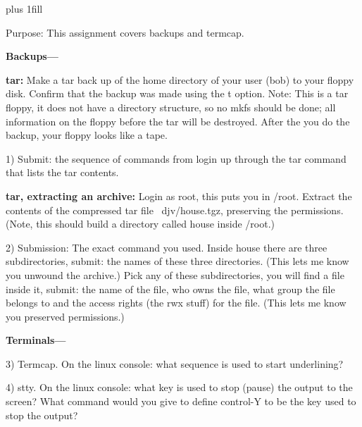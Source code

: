 
\rightskip=0pt plus 1fill

\parindent 0pt

Purpose: This assignment covers backups and termcap.

{\bf Backups---}

{\bf tar:}
Make a tar back up of the home directory of your user (bob) to your floppy
disk.
Confirm that the backup was made using the {\ltt{}t} option.
Note: This is a tar floppy, it does not have a directory structure,
so no mkfs should be done; all information on the floppy before
the tar will be destroyed. After the you do the backup, your
floppy looks like a tape.

1) Submit: the sequence of commands from login up through the
tar command that lists the tar contents.

{\bf tar, extracting an archive:}
Login as root, this puts you in {\ltt{}/root}.
Extract the contents of the compressed tar file {\ltt{}~djv/house.tgz},
preserving the permissions.
(Note, this should build a directory called {\ltt{}house} inside {\ltt{}/root}.)

2) Submission: The exact command you used.
Inside {\ltt{}house} there are three subdirectories, submit: the names of
these three directories. (This lets me know you unwound the archive.)
Pick any of these subdirectories, you will find a file inside it,
submit: the name of the file, who owns the file, what group the file
belongs to and the access rights (the {\ltt{}rwx} stuff) for the file.
(This lets me know you preserved permissions.)

{\bf Terminals---}

3) Termcap.
On the linux console: what sequence is used to 
start underlining?

4) stty.
On the linux console: what key is used to stop (pause) the output to the
screen?
What command would you give to define control-Y to be the key used
to stop the output?

\bye
